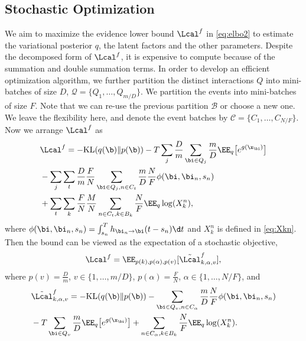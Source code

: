 \subsection{Stochastic Optimization}
We aim to maximize the evidence lower bound $\Lcal^f$ in \eqref{eq:elbo2} to estimate the variational posterior $q$, the latent factors and the other parameters. Despite the decomposed form of $\Lcal^f$, it is expensive to compute because of the summation and double summation terms. In order to develop an efficient optimization algorithm, we further partition the distinct interactions $Q$ into mini-batches of size $D$, $\mathcal{Q} = \{Q_1, \ldots, Q_{m/D}\}$. We partition the events into mini-batches of size $F$. Note that we can re-use the previous partition $\mathcal{B}$ or choose a new one. We leave the flexibility here, and denote the event batches by $\mathcal{C} = \{C_1, \ldots, C_{N/F}\}$. Now we arrange $\Lcal^f$ as 
\begin{align}
&\Lcal^f = -\mathrm{KL}(q(\b) \| p(\b)) -T\sum_{j} \frac{D}{m}  \sum_{\bi \in Q_j}\frac{m}{D} \EE_{q}\big[e^{g(\x_\bi)}\big]  \notag \\
& - \sum_{j} \sum_{t} \frac{D}{m} \frac{F}{N}  \sum_{\bi \in Q_j, n \in C_t} \frac{m}{D} \frac{N}{F}  \phi(\bi, \bi_n, s_n)  \notag \\
& +\sum_{t}\sum_{k} \frac{F}{N} \frac{M}{N} \sum_{n \in C_t, k \in B_k} \frac{N}{F} \EE_{q}\log(X_k^n), 
\end{align}
where $\phi(\bi, \bi_n, s_n) =\int_{s_n}^T h_{\bi_n \rightarrow \bi}(t-s_n) \d t $ and $X_k^n$ is defined in \eqref{eq:Xkn}. Then the bound can be viewed as the expectation of a stochastic objective, 
\begin{align}
\Lcal^f = \EE_{p(k), p(\alpha), p(v)}[ \tilde{\Lcal}^f_{k,\alpha,v}], \label{eq:expt_elbo}
\end{align}
 where $p(v) = \frac{D}{m}$, $v \in \{1, \ldots, m/D\}$, $p(\alpha) = \frac{F}{N}$, $\alpha \in \{1, \ldots, N/F\}$, and 
\begin{align}
&\tilde{\Lcal}^f_{k,\alpha,v} = -\mathrm{KL}(q(\b) \| p(\b))-\sum_{\bi \in Q_v, n \in C_\alpha} \frac{m}{D} \frac{N}{F}  \phi(\bi, \bi_n, s_n)   \notag \\
& -T\sum_{\bi \in Q_v}\frac{m}{D} \EE_{q}\big[e^{g(\x_\bi)}\big] + \sum_{n \in C_\alpha, k \in B_k} \frac{N}{F} \EE_{q}\log(X_k^n). \label{eq:sto_obj} \raisetag{8mm}
\end{align}
 
